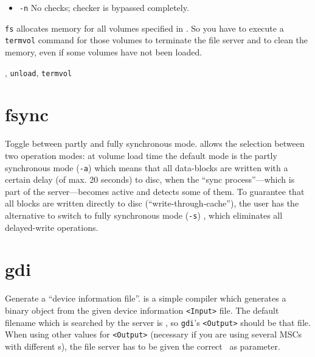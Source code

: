 \begin{man}
\begin{itemize}
\begin{itemize}
               \item {\tt -n}\newline
                 No checks; checker is bypassed completely.

               \end{itemize}
             \end{itemize}

             \begin{note}
               {\tt fs} allocates memory for all volumes specified in \DI. So you
               have to execute a {\tt termvol} command for those volumes to terminate
               the file server and to clean the memory, even if some volumes have
               not been loaded.
             \end{note}

  , {\tt unload}, {\tt termvol}
\end{man}

\section{fsync}
\begin{man}
  \PP Toggle between partly and fully synchronous mode.
   allows the selection between two operation modes: at volume
             load time the default mode is the partly synchronous mode ({\tt -a})
             which means that all data-blocks are written with a certain delay
             (of max. 20 seconds) to disc, when the ``sync process''---which is
             part of the server---becomes active and detects some of them. To
             guarantee that all blocks are written directly to disc
             (``write-through-cache''), the user has the alternative to switch to
             fully synchronous mode ({\tt -s}) , which eliminates all delayed-write
             operations.
\end{man}

\section{gdi}
\begin{man}
  \PP Generate a ``device information file''.
   is a simple compiler which generates a binary object from the
             given device information {\tt <Input>} file. The default filename which
             is searched by the server is \HEDI, so {\tt gdi}'s
             {\tt <Output>} should be that file. When using other values for
             {\tt <Output>} (necessary if you are using several MSCs with different
             \DI s), the file server has to be given the correct \DI\ as
             parameter.
\end{man}

